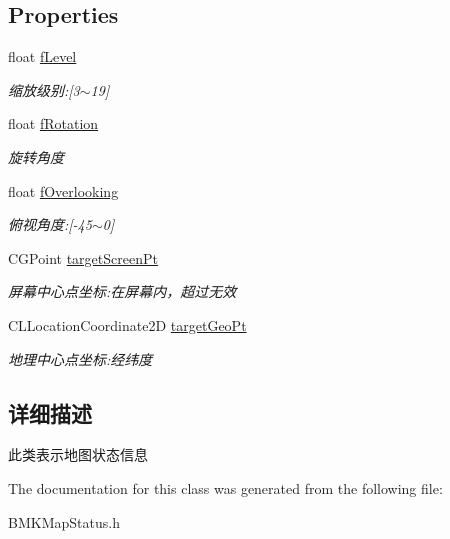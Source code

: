\subsection*{Properties}
\begin{DoxyCompactItemize}
\item 
\hypertarget{interface_b_m_k_map_status_abe3f9d36eee716ca15394aab89e1134c}{float \hyperlink{interface_b_m_k_map_status_abe3f9d36eee716ca15394aab89e1134c}{f\-Level}}\label{interface_b_m_k_map_status_abe3f9d36eee716ca15394aab89e1134c}

\begin{DoxyCompactList}\small\item\em 缩放级别\-:\mbox{[}3$\sim$19\mbox{]} \end{DoxyCompactList}\item 
\hypertarget{interface_b_m_k_map_status_a3c22c82aead710c2dec187ff1d39e370}{float \hyperlink{interface_b_m_k_map_status_a3c22c82aead710c2dec187ff1d39e370}{f\-Rotation}}\label{interface_b_m_k_map_status_a3c22c82aead710c2dec187ff1d39e370}

\begin{DoxyCompactList}\small\item\em 旋转角度 \end{DoxyCompactList}\item 
\hypertarget{interface_b_m_k_map_status_abd88f1cfbe5a8bbf2503c51802bf5c96}{float \hyperlink{interface_b_m_k_map_status_abd88f1cfbe5a8bbf2503c51802bf5c96}{f\-Overlooking}}\label{interface_b_m_k_map_status_abd88f1cfbe5a8bbf2503c51802bf5c96}

\begin{DoxyCompactList}\small\item\em 俯视角度\-:\mbox{[}-\/45$\sim$0\mbox{]} \end{DoxyCompactList}\item 
\hypertarget{interface_b_m_k_map_status_a902555f3b28504a2217443c496edc491}{C\-G\-Point \hyperlink{interface_b_m_k_map_status_a902555f3b28504a2217443c496edc491}{target\-Screen\-Pt}}\label{interface_b_m_k_map_status_a902555f3b28504a2217443c496edc491}

\begin{DoxyCompactList}\small\item\em 屏幕中心点坐标\-:在屏幕内，超过无效 \end{DoxyCompactList}\item 
\hypertarget{interface_b_m_k_map_status_a98d10950c91d08dce079020baafbe10d}{C\-L\-Location\-Coordinate2\-D \hyperlink{interface_b_m_k_map_status_a98d10950c91d08dce079020baafbe10d}{target\-Geo\-Pt}}\label{interface_b_m_k_map_status_a98d10950c91d08dce079020baafbe10d}

\begin{DoxyCompactList}\small\item\em 地理中心点坐标\-:经纬度 \end{DoxyCompactList}\end{DoxyCompactItemize}


\subsection{详细描述}
此类表示地图状态信息 

The documentation for this class was generated from the following file\-:\begin{DoxyCompactItemize}
\item 
B\-M\-K\-Map\-Status.\-h\end{DoxyCompactItemize}
